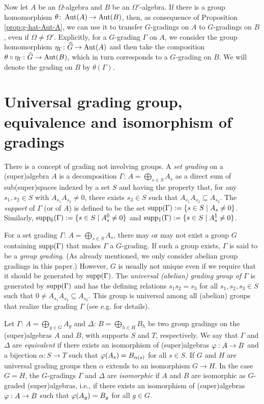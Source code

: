 Now let $A$ be an $\Omega$-algebra and $B$ be an $\Omega'$-algebra. 
If there is a group homomorphism $\theta\colon \operatorname{Aut}(A) \to \operatorname{Aut}(B)$, then, as consequence of Proposition \ref{prop:g-hat-Aut-A}, we can use it to transfer $G$-gradings on $A$ to $G$-gradings on $B$, even if $\Omega \neq \Omega'$. 
Explicitly, for a $G$-grading $\Gamma$ on $A$, we consider the group homomorphism $\eta_\Gamma\colon \widehat G \to \operatorname{Aut} (A)$ and then take the composition $\theta \circ \eta_\Gamma\colon \widehat G \to \operatorname{Aut}(B)$, which in turn corresponds to a $G$-grading on $B$. 
We will denote the grading on $B$ by $\theta(\Gamma)$.

\section{Universal grading group, equivalence and isomorphism of gradings}\label{ssec:universal_group}

There is a concept of grading not involving groups. A \emph{set grading} on a (super)algebra $A$ is a decomposition $\Gamma:\,A=\bigoplus_{s\in S}A_s$ as a direct sum of sub\-(su\-per)\-spa\-ces indexed by a set $S$ and having the property that, for any $s_1,s_2\in S$ with $A_{s_1}A_{s_2}\ne 0$, there exists $s_3\in S$ such that $A_{s_1}A_{s_2}\subseteq A_{s_3}$. The \emph{support} of $\Gamma$ (or of $A$) is defined to be the set $\operatorname{supp}(\Gamma) := \{s\in S \mid A_s \neq 0\}$.
Similarly, $\operatorname{supp}_{\bar{0}}(\Gamma) := \{s\in S \mid A_s^{\bar{0}} \neq 0\}$ and $\operatorname{supp}_{\bar{1}}(\Gamma) := \{s\in S \mid A_s^{\bar{1}} \neq 0\}$.

For a set grading $\Gamma:\,A=\bigoplus_{s\in S}A_s$, there may or may not exist a group $G$ containing $\operatorname{supp}(\Gamma)$ that makes $\Gamma$ a $G$-grading. 
If such a group exists, $\Gamma$ is said to be a {\em group grading}. (As already mentioned, we only consider abelian group gradings in this paper.) 
However, $G$ is usually not unique even if we require that it should be generated by $\operatorname{supp}(\Gamma)$. 
The {\em universal (abelian) grading group of $\Gamma$} \cite{PZ} is generated by $\operatorname{supp}(\Gamma)$ and has the defining relations 
$s_1s_2=s_3$ for all $s_1,s_2,s_3\in S$ such that $0\neq A_{s_1}A_{s_2}\subseteq A_{s_3}$. 
This group is universal among all (abelian) groups that realize the grading $\Gamma$ (see e.g. \cite[Chapter 1]{livromicha} for details).

Let $\Gamma:\,A=\bigoplus_{g\in G} A_g$ and $\Delta:\,B=\bigoplus_{h\in H} B_h$ be two group gradings on the (super)algebras $A$ and $B$, with supports $S$ and $T$, respectively.
We say that $\Gamma$ and $\Delta$ are {\em equivalent} if there exists an isomorphism of (super)algebras $\varphi: A\to B$ and a bijection $\alpha: S\to T$ such that $\varphi(A_s)=B_{\alpha(s)}$ for all $s\in S$. If $G$ and $H$ are universal grading groups then $\alpha$ extends to an isomorphism $G\to H$. In the case $G=H$, the $G$-gradings $\Gamma$ and $\Delta$ are {\em isomorphic} if $A$ and $B$ are isomorphic as $G$-graded (super)algebras, i.e., if there exists an isomorphism of (super)algebras $\varphi: A\to B$ such that $\varphi(A_g)=B_g$ for all $g\in G$.

